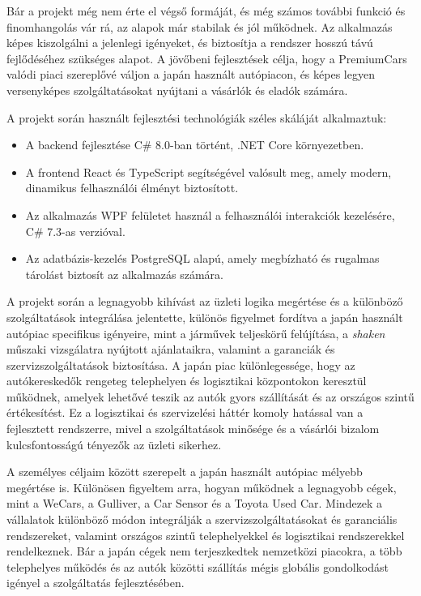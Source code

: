 \documentclass{report}[11pt]
\begin{document}
Bár a projekt még nem érte el végső formáját, és még számos további funkció és finomhangolás vár rá, az alapok már stabilak és jól működnek. Az alkalmazás képes kiszolgálni a jelenlegi igényeket, és biztosítja a rendszer hosszú távú fejlődéséhez szükséges alapot. A jövőbeni fejlesztések célja, hogy a PremiumCars valódi piaci szereplővé váljon a japán használt autópiacon, és képes legyen versenyképes szolgáltatásokat nyújtani a vásárlók és eladók számára.

A projekt során használt fejlesztési technológiák széles skáláját alkalmaztuk:
\begin{itemize}
    \item A backend fejlesztése C\# 8.0-ban történt, .NET Core környezetben.
    \item A frontend React és TypeScript segítségével valósult meg, amely modern, dinamikus felhasználói élményt biztosított.
    \item Az alkalmazás WPF felületet használ a felhasználói interakciók kezelésére, C\# 7.3-as verzióval.
    \item Az adatbázis-kezelés PostgreSQL alapú, amely megbízható és rugalmas tárolást biztosít az alkalmazás számára.
\end{itemize}

A projekt során a legnagyobb kihívást az üzleti logika megértése és a különböző szolgáltatások integrálása jelentette, különös figyelmet fordítva a japán használt autópiac specifikus igényeire, mint a járművek teljeskörű felújítása, a \textit{shaken} műszaki vizsgálatra nyújtott ajánlataikra, valamint a garanciák és szervizszolgáltatások biztosítása. A japán piac különlegessége, hogy az autókereskedők rengeteg telephelyen és logisztikai központokon keresztül működnek, amelyek lehetővé teszik az autók gyors szállítását és az országos szintű értékesítést. Ez a logisztikai és szervizelési háttér komoly hatással van a fejlesztett rendszerre, mivel a szolgáltatások minősége és a vásárlói bizalom kulcsfontosságú tényezők az üzleti sikerhez.

A személyes céljaim között szerepelt a japán használt autópiac mélyebb megértése is. Különösen figyeltem arra, hogyan működnek a legnagyobb cégek, mint a WeCars, a Gulliver, a Car Sensor és a Toyota Used Car. Mindezek a vállalatok különböző módon integrálják a szervizszolgáltatásokat és garanciális rendszereket, valamint országos szintű telephelyekkel és logisztikai rendszerekkel rendelkeznek. Bár a japán cégek nem terjeszkedtek nemzetközi piacokra, a több telephelyes működés és az autók közötti szállítás mégis globális gondolkodást igényel a szolgáltatás fejlesztésében.
\end{document}

